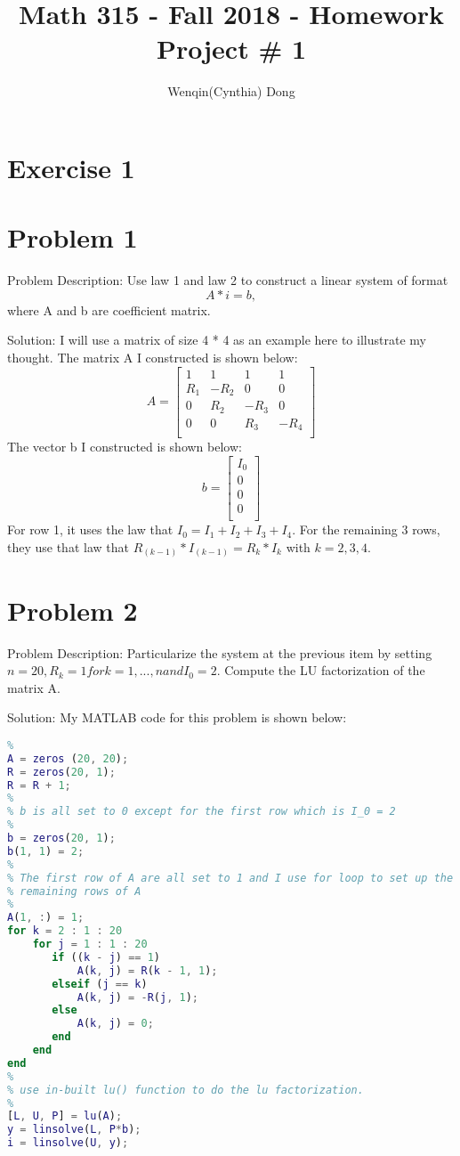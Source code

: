 \documentclass[12pt,letter,english]{article}
\title{Math 315 - Fall 2018 - Homework Project \# 1}
\author{Wenqin(Cynthia) Dong}
\begin{document}
	
\section*{Exercise 1}
\section*{Problem 1}

Problem Description: Use law 1 and law 2 to construct a linear system of format 
$$
   A*i = b,
$$
where A and b are coefficient matrix.

Solution: I will use a matrix of size 4 * 4 as an example here to illustrate my thought. The matrix A I constructed is shown below:
\[
  A=
  \left[ {\begin{array}{cccc}
   1 & 1 & 1 & 1\\
   R_1 & -R_2 & 0 & 0\\
   0 & R_2 & -R_3 & 0\\
   0 & 0 & R_3 & -R_4\\
  \end{array} } \right]
\]
The vector b I constructed is shown below:
\[
  b=
  \left[ {\begin{array}{c}
   I_0\\
   0\\
   0\\
   0\\
  \end{array} } \right]
\]
For row 1, it uses the law that $I_0 = I_1 + I_2 + I_3 + I_4$. For the remaining 3 rows, they use that law that $R_(k-1)*I_(k-1) = R_k*I_k$ with $k = 2, 3, 4$.

\section*{Problem 2}
Problem Description: Particularize the system at the previous item by setting $ n= 20,R_k = 1 for k= 1,...,n and I_0= 2$. Compute the LU factorization of the matrix A.

Solution: My MATLAB code for this problem is shown below:


\begin{lstlisting}[language = Matlab]
% initialize matrix A and b. R is used to help with constructing A
%
A = zeros (20, 20);
R = zeros(20, 1);
R = R + 1;
%
% b is all set to 0 except for the first row which is I_0 = 2
%
b = zeros(20, 1);
b(1, 1) = 2;
%
% The first row of A are all set to 1 and I use for loop to set up the 
% remaining rows of A
%
A(1, :) = 1;
for k = 2 : 1 : 20
    for j = 1 : 1 : 20
       if ((k - j) == 1) 
           A(k, j) = R(k - 1, 1);
       elseif (j == k)
           A(k, j) = -R(j, 1);
       else
           A(k, j) = 0;
       end
    end
end
%
% use in-built lu() function to do the lu factorization.
%
[L, U, P] = lu(A);
y = linsolve(L, P*b);
i = linsolve(U, y);
\end{lstlisting}
\end{document}
